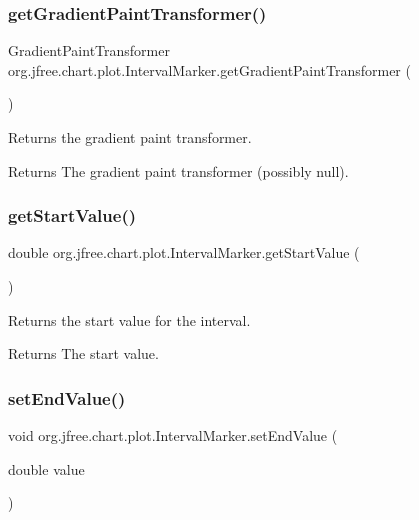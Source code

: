 \subsubsection{\texorpdfstring{get\+Gradient\+Paint\+Transformer()}{getGradientPaintTransformer()}}
{\footnotesize\ttfamily Gradient\+Paint\+Transformer org.\+jfree.\+chart.\+plot.\+Interval\+Marker.\+get\+Gradient\+Paint\+Transformer (\begin{DoxyParamCaption}{ }\end{DoxyParamCaption})}

Returns the gradient paint transformer.

\begin{DoxyReturn}{Returns}
The gradient paint transformer (possibly {\ttfamily null}). 
\end{DoxyReturn}
\mbox{\label{classorg_1_1jfree_1_1chart_1_1plot_1_1_interval_marker_ab5420c80bec65dbc6a29ca4676ac4d02}} 
\subsubsection{\texorpdfstring{get\+Start\+Value()}{getStartValue()}}
{\footnotesize\ttfamily double org.\+jfree.\+chart.\+plot.\+Interval\+Marker.\+get\+Start\+Value (\begin{DoxyParamCaption}{ }\end{DoxyParamCaption})}

Returns the start value for the interval.

\begin{DoxyReturn}{Returns}
The start value. 
\end{DoxyReturn}
\mbox{\label{classorg_1_1jfree_1_1chart_1_1plot_1_1_interval_marker_ae944891070e96e056355eb84354ceec4}} 
\subsubsection{\texorpdfstring{set\+End\+Value()}{setEndValue()}}
{\footnotesize\ttfamily void org.\+jfree.\+chart.\+plot.\+Interval\+Marker.\+set\+End\+Value (\begin{DoxyParamCaption}\item[{double}]{value }\end{DoxyParamCaption})}


